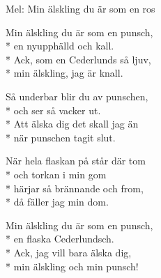 \begin{SongText}
    \begin{SongInfo}
        Mel: Min älskling du är som en ros
    \end{SongInfo}
    \begin{SongVerse}
        Min älskling du är som en punsch,\\*%
        en nyupphälld och kall.\\*%
        Ack, som en Cederlunds så ljuv,\\*%
        min älskling, jag är knall.
    \end{SongVerse}
    \begin{SongVerse}
        Så underbar blir du av punschen,\\*%
        och ser så vacker ut.\\*%
        Att älska dig det skall jag än\\*%
        när punschen tagit slut.
    \end{SongVerse}
    \begin{SongVerse}
        När hela flaskan på står där tom\\*%
        och torkan i min gom\\*%
        härjar så brännande och from,\\*%
        då fäller jag min dom.
    \end{SongVerse}
    \begin{SongVerse}
        Min älskling du är som en punsch,\\*%
        en flaska Cederlundsch.\\*%
        Ack, jag vill bara älska dig,\\*%
        min älskling och min punsch!
    \end{SongVerse}\end{SongText}

